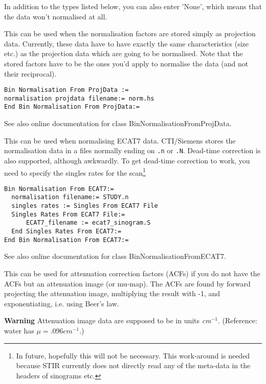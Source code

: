 \documentclass{article}
\begin{document}
In addition to the types listed below, you can also enter 'None', 
which means that the data won't normalised at all.

{ 
}

This can be used when the normalisation factors are stored simply 
as projection data. Currently, these data have to have exactly 
the same characteristics (size etc.) as the projection data which 
are going to be normalised. Note that the stored factors have 
to be the ones you'd apply to normalise the data (and not their 
reciprocal).

{ 
}
\begin{verbatim}
Bin Normalisation From ProjData :=
normalisation projdata filename:= norm.hs
End Bin Normalisation From ProjData:=
\end{verbatim}

See also online documentation for class BinNormalisationFromProjData.

{ 
}

This can be used when normalising ECAT7 data. CTI/Siemens stores
the normalisation data in a files normally ending on
\texttt{.n} or \texttt{.N}. Dead-time correction is also
supported, although awkwardly. To get dead-time correction
to work, you need to specify the singles rates for the 
scan\footnote{In future, hopefully this will not be necessary.
This work-around is needed because STIR currently does not
directly read any of the meta-data in the headers of sinograms etc.}
{ 
}
\begin{verbatim}
Bin Normalisation From ECAT7:=
  normalisation filename:= STUDY.n
  singles rates := Singles From ECAT7 File
  Singles Rates From ECAT7 File:=
      ECAT7_filename := ecat7_sinogram.S
  End Singles Rates From ECAT7:=
End Bin Normalisation From ECAT7:=
\end{verbatim}

See also online documentation for class BinNormalisationFromECAT7.

{ 
}
\label{sec:binnormalisationfromattenuationimage}
This can be used for attenuation correction factors (ACFs) if 
you do not have the ACFs but an attenuation image (or mu-map). 
The ACFs are found by forward projecting the attenuation image, 
multiplying the result with -1, and exponentiating, i.e. using 
Beer's law.



\textbf{Warning} Attenuation image data are supposed to be in units \textit{cm}$^{-1}$. 
(Reference: water has $\mu=.096 \mathit{cm}^{-1}$.)
\end{document}
